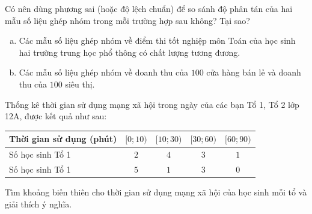 \begin{bt}%
	Có nên dùng phương sai (hoặc độ lệch chuẩn) để so sánh độ phân tán của hai mẫu số liệu ghép nhóm trong mỗi trường hợp sau không? Tại sao?
	\begin{enumerate}[a)]
	\item  Các mẫu số liệu ghép nhóm về điểm thi tốt nghiệp môn Toán của học sinh hai trường trung học phổ thông có chất lượng tương đương.
	\item Các mẫu số liệu ghép nhóm về doanh thu của $100$ cửa hàng bán lẻ và doanh thu của $100$ siêu thị.
	\end{enumerate}
\end{bt}

\begin{vd}%
	Thống kê thời gian sử dụng mạng xã hội trong ngày của các bạn Tổ 1, Tổ 2 lớp 12A, được kết quả như sau:
	\begin{center}
		\begin{tabular}{|l|c|c|c|c|}
			\hline
			Thời gian sử dụng (phút) & $[0;10 )$ & $[ 10;30)$ &$[30;60 )$ & $[60;90)$ \\
			\hline
			Số học sinh Tổ 1 & $2$ & $4$ & $3$ & $1$ \\
			\hline
			Số học sinh Tổ 1 & $5$ & $1$ & $3$ & $0$ \\
			\hline
		\end{tabular}
	\end{center}
	Tìm khoảng biến thiên cho thời gian sử dụng mạng xã hội của học sinh mỗi tổ và giải thích ý nghĩa.
\end{vd}

